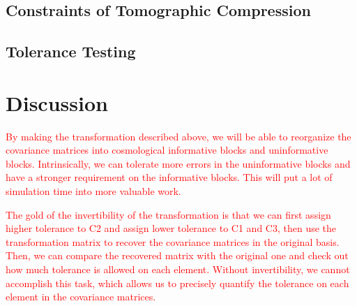 \documentclass[twocolumn]{\docclass}
\begin{document}
	
	
	\subsection{Constraints of Tomographic Compression}
	
	
	
	
	
	\subsection{Tolerance Testing}
	
	
	
	
	
	\section{Discussion}
	\label{sec:discussion}
	
	
	\textcolor{red}{By making the transformation described above, we will be able to reorganize the covariance matrices into cosmological informative blocks and uninformative blocks. Intrinsically, we can tolerate more errors in the uninformative blocks and have a stronger requirement on the informative blocks. This will put a lot of simulation time into more valuable work.}
	
	\textcolor{red}{The gold of the invertibility of the transformation is that we can first assign higher tolerance to C2 and assign lower tolerance to C1 and C3, then use the transformation matrix to recover the covariance matrices in the original basis. Then, we can compare the recovered matrix with the original one and check out how much tolerance is allowed on each element. Without invertibility, we cannot accomplish this task, which allows us to precisely quantify the tolerance on each element in the covariance matrices.}
	
	
	
\end{document}

